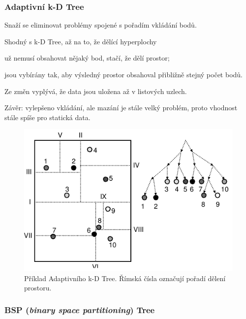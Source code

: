 \subsubsection{Adaptivní k-D Tree}

\begin{compactitem}
    \item Snaží se eliminovat problémy spojené s pořadím vkládání bodů.

    \item Shodný s k-D Tree, až na to, že dělící hyperplochy
    \begin{compactitem}
        \item už nemusí obsahovat nějaký bod, stačí, že dělí prostor;
        \item jsou vybírány tak, aby výsledný prostor obsahoval přibližně stejný počet bodů.
    \end{compactitem}

    \item Ze změn vyplývá, že data jsou uložena až v listových uzlech.

    \item Závěr: vylepšeno vkládání, ale mazání je stále velký problém, proto vhodnost stále spíše pro statická data.
\end{compactitem}

\begin{figure}[H]
    \centering
    \includegraphics[width=0.75\linewidth]{adaptivni_kd_tree.pdf}
    \caption{Příklad Adaptivního k-D Tree. Římská čísla označují pořadí dělení prostoru.}
\end{figure}

\subsubsection{BSP (\textit{binary space partitioning}) Tree}

